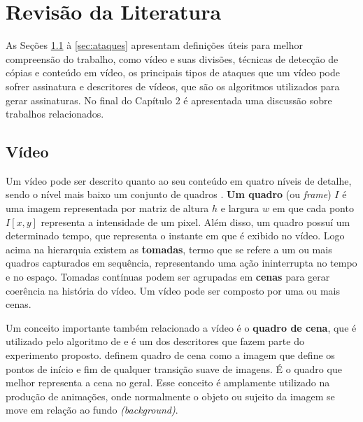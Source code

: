

\chapter{Revisão da Literatura}
\label{chap:revisao}

As Seções \ref{sec:video} à \ref{sec:ataques} apresentam definições úteis para melhor compreensão do trabalho, como vídeo e suas divisões, técnicas de detecção de cópias e conteúdo em vídeo, os principais tipos de ataques que um vídeo pode sofrer assinatura e descritores de vídeos, que são os algoritmos utilizados para gerar assinaturas. No final do Capítulo 2 é apresentada uma discussão sobre trabalhos relacionados.



\section{Vídeo}
\label{sec:video}  
                                                                                               Um vídeo pode ser descrito quanto ao seu conteúdo em quatro níveis de detalhe, sendo o nível mais baixo um conjunto de quadros \citeauthor{lienhart1997video}. \textbf{Um quadro} (ou \textit{frame}) $I$ é uma imagem representada por matriz de altura $h$ e largura $w$ em que cada ponto $I[x,y]$ representa a intensidade de um pixel. Além disso, um quadro possuí um determinado tempo, que representa o instante em que é exibido no vídeo. 
                                                                                               Logo acima na hierarquia existem as \textbf{tomadas}, termo que se refere a um ou mais quadros capturados em sequência, representando uma ação ininterrupta no tempo e no espaço. Tomadas contínuas podem ser agrupadas em \textbf{cenas} para gerar coerência na história do vídeo. Um vídeo pode ser composto por uma ou mais cenas.

       Um conceito importante também relacionado a vídeo é o \textbf{quadro de cena}, que é utilizado pelo algoritmo de \citeauthor{mao2015sceneframe} e é um dos descritores que fazem parte do experimento proposto. \citeauthor{7848130} definem quadro de cena como a imagem que define os pontos de início e fim de qualquer transição suave de imagens. É o quadro que melhor representa a cena no geral. Esse conceito é amplamente utilizado na produção de animações, onde normalmente o objeto ou sujeito da imagem se move em relação ao fundo \textit{(background)}. 

